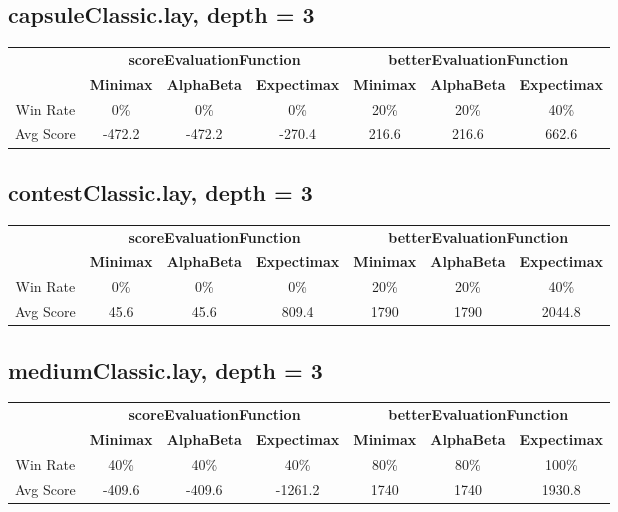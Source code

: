 \documentclass[english, a4paper,12pt]{article}
\begin{document}
\subsection*{capsuleClassic.lay, depth = 3}
\small\begin{tabular}{|c|c|c|c|c|c|c|}
\hline
\text{ } & \multicolumn{3}{c|}{\textbf{scoreEvaluationFunction}} & \multicolumn{3}{c|}{\textbf{betterEvaluationFunction}} \\
\cline{2-7}
& \textbf{Minimax} & \textbf{AlphaBeta} & \textbf{Expectimax} & \textbf{Minimax} & \textbf{AlphaBeta} & \textbf{Expectimax} \\
\hline
Win Rate & 0\% & 0\% & 0\% & 20\% & 20\% & 40\%\\
Avg Score & -472.2 & -472.2 & -270.4 & 216.6 & 216.6 & 662.6\\ 
\hline
\end{tabular}

\subsection*{contestClassic.lay, depth = 3}
\small\begin{tabular}{|c|c|c|c|c|c|c|}
\hline
\text{ } & \multicolumn{3}{c|}{\textbf{scoreEvaluationFunction}} & \multicolumn{3}{c|}{\textbf{betterEvaluationFunction}} \\
\cline{2-7}
& \textbf{Minimax} & \textbf{AlphaBeta} & \textbf{Expectimax} & \textbf{Minimax} & \textbf{AlphaBeta} & \textbf{Expectimax} \\
\hline
Win Rate & 0\% & 0\% & 0\% & 20\% & 20\% & 40\%\\
Avg Score & 45.6 & 45.6 & 809.4 & 1790 & 1790 & 2044.8\\ 
\hline
\end{tabular}

\subsection*{mediumClassic.lay, depth = 3}
\small\begin{tabular}{|c|c|c|c|c|c|c|}
\hline
\text{ } & \multicolumn{3}{c|}{\textbf{scoreEvaluationFunction}} & \multicolumn{3}{c|}{\textbf{betterEvaluationFunction}} \\
\cline{2-7}
& \textbf{Minimax} & \textbf{AlphaBeta} & \textbf{Expectimax} & \textbf{Minimax} & \textbf{AlphaBeta} & \textbf{Expectimax} \\
\hline
Win Rate & 40\% & 40\% & 40\% & 80\% & 80\% & 100\%\\
Avg Score & -409.6 & -409.6 & -1261.2 & 1740 & 1740 & 1930.8\\ 
\hline
\end{tabular}
\end{document}
